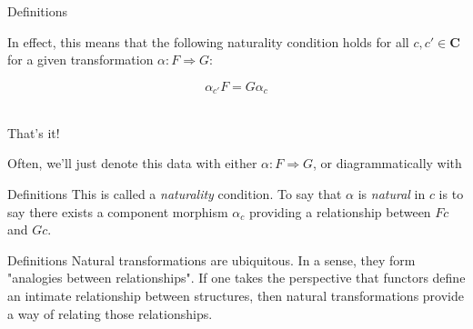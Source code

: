 \documentclass[tikz]{beamer}
\theoremstyle{definition}
\begin{document}
\begin{frame}{Definitions}

In effect, this means that the following naturality condition holds for all $c, c' \in \mathbf{C}$ for a given transformation $\alpha: F \Rightarrow G$: 

\begin{center}
    \begin{equation*}
        \alpha_{c'}F = G \alpha_c
    \end{equation*}{}
\end{center}{}
    \\
That's it!
\end{frame}{}

\begin{frame}[fragile]

Often, we'll just denote this data with either  $\alpha: F \Rightarrow G$, or diagrammatically with 

\begin{center}

                     
    {}
\end{center}{}
    

\end{frame}

\begin{frame}{Definitions}
    This is called a \textit{naturality} condition. To say that $\alpha$ is \textit{natural} in $c$ is to say there exists a component morphism $\alpha_c$ providing a relationship between $Fc$ and $Gc$.
\end{frame}{}

\begin{frame}{Definitions}
    Natural transformations are ubiquitous. In a sense, they form "analogies between relationships". If one takes the perspective that functors define an intimate relationship between structures, then natural transformations provide a way of relating those relationships.
\end{frame}
\end{document}
